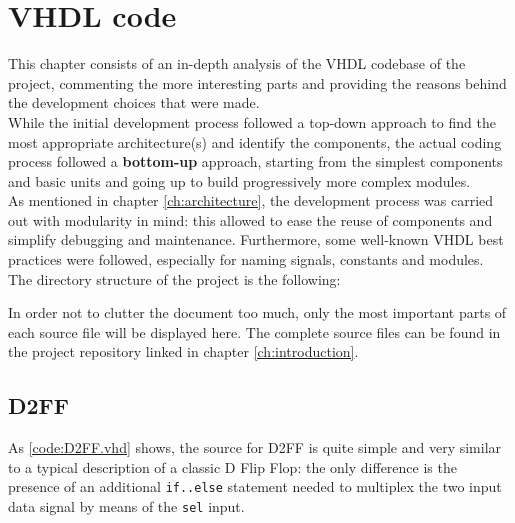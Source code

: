 %
\chapter{VHDL code}\label{ch:vhdl_code}
This chapter consists of an in-depth analysis of the VHDL codebase of the project, commenting the more interesting parts and providing the reasons behind the development choices that were made.\\
While the initial development process followed a top-down approach to find the most appropriate architecture(s) and identify the components, the actual coding process followed a \textbf{bottom-up} approach, starting from the simplest components and basic units and going up to build progressively more complex modules.\\
As mentioned in chapter \ref{ch:architecture}, the development process was carried out with modularity in mind: this allowed to ease the reuse of components and simplify debugging and maintenance. Furthermore, some well-known VHDL best practices were followed, especially for naming signals, constants and modules.\\
\hfill \break
The directory structure of the project is the following:\\

\pagebreak

In order not to clutter the document too much, only the most important parts of each source file will be displayed here. The complete source files can be found in the project repository linked in chapter \ref{ch:introduction}.\\


\section{D2FF}\label{section:D2FF.vhd}
\lstset{style=codestyle}\label{code:D2FF.vhd}

\hfill \break
As \ref{code:D2FF.vhd} shows, the source for D2FF is quite simple and very similar to a typical description of a classic D Flip Flop: the only difference is the presence of an additional \texttt{if..else} statement needed to multiplex the two input data signal by means of the \texttt{sel} input.\\

